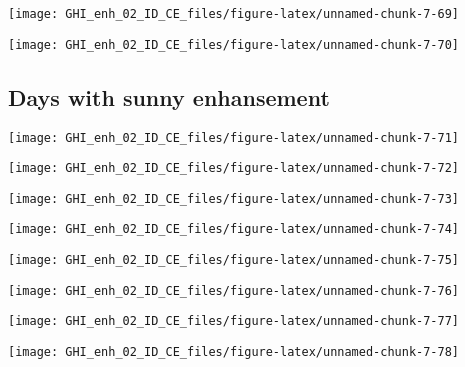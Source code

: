 \documentclass[
  10pt,
  a4paper,oneside]{article}
\begin{document}
\begin{center}\texttt{[image: GHI\_enh\_02\_ID\_CE\_files/figure-latex/unnamed-chunk-7-69]} \end{center}

\begin{center}\texttt{[image: GHI\_enh\_02\_ID\_CE\_files/figure-latex/unnamed-chunk-7-70]} \end{center}

\FloatBarrier

\hypertarget{days-with-sunny-enhansement}{%
\subsection{Days with sunny enhansement}\label{days-with-sunny-enhansement}}

\begin{center}\texttt{[image: GHI\_enh\_02\_ID\_CE\_files/figure-latex/unnamed-chunk-7-71]} \end{center}

\begin{center}\texttt{[image: GHI\_enh\_02\_ID\_CE\_files/figure-latex/unnamed-chunk-7-72]} \end{center}

\begin{center}\texttt{[image: GHI\_enh\_02\_ID\_CE\_files/figure-latex/unnamed-chunk-7-73]} \end{center}

\begin{center}\texttt{[image: GHI\_enh\_02\_ID\_CE\_files/figure-latex/unnamed-chunk-7-74]} \end{center}

\begin{center}\texttt{[image: GHI\_enh\_02\_ID\_CE\_files/figure-latex/unnamed-chunk-7-75]} \end{center}

\begin{center}\texttt{[image: GHI\_enh\_02\_ID\_CE\_files/figure-latex/unnamed-chunk-7-76]} \end{center}

\begin{center}\texttt{[image: GHI\_enh\_02\_ID\_CE\_files/figure-latex/unnamed-chunk-7-77]} \end{center}

\begin{center}\texttt{[image: GHI\_enh\_02\_ID\_CE\_files/figure-latex/unnamed-chunk-7-78]} \end{center}
\end{document}
